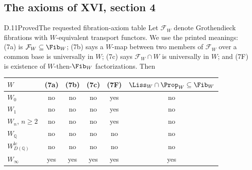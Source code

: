 \subsection{The axioms of XVI, section 4}
\begin{claim}{D.11}{Proved}{The requested fibration-axiom table}
Let $\mathcal F_W$ denote Grothendieck fibrations with $W$-equivalent transport functors. We use the printed meanings: (7a) is $\mathcal F_W\subseteq\Fib_W$; (7b) says a $W$-map between two members of $\mathcal F_W$ over a common base is universally in $W$; (7c) says $\mathcal F_W\cap W$ is universally in $W$; and (7F) is existence of $W$-then-$\Fib_W$ factorizations. Then
\begin{center}\begin{tabular}{lccccc}
\toprule $W$ & (7a)&(7b)&(7c)&(7F)&$\Liss_W\cap\Prop_W\subseteq\Fib_W$\\\midrule
$W_0$ & no&no&no&yes&no\\
$W_1$ & no&no&no&yes&no\\
$W_n$, $n\geq2$ & no&no&no&yes&no\\
$W_{\mathbb Q}$ & no&no&no&no&no\\
$W_{D(\mathbb Q)}^{\mathrm{lc}}$ & no&no&no&no&no\\
$W_\infty$ & yes&yes&yes&yes&yes\\\bottomrule
\end{tabular}\end{center}
\end{claim}
